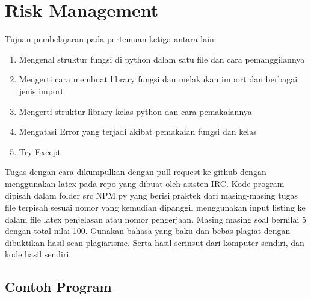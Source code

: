 \chapter{Risk Management}
Tujuan pembelajaran pada pertemuan ketiga antara lain:
\begin{enumerate}
\item
Mengenal struktur fungsi di python dalam satu file dan cara pemanggilannya
\item
Mengerti cara membuat library fungsi dan melakukan import dan berbagai jenis import
\item
Mengerti struktur library kelas python dan cara pemakaiannya
\item
Mengatasi Error yang terjadi akibat pemakaian fungsi dan kelas
\item
Try Except
\end{enumerate}
Tugas dengan cara dikumpulkan dengan pull request ke github dengan menggunakan latex pada repo yang dibuat oleh asisten IRC. Kode program dipisah dalam folder src NPM.py yang berisi praktek dari masing-masing tugas file terpisah sesuai nomor yang kemudian dipanggil menggunakan input listing ke dalam file latex penjelasan atau nomor pengerjaan. Masing masing soal bernilai 5 dengan total nilai 100. Gunakan bahasa yang baku dan bebas plagiat dengan dibuktikan hasil scan plagiarisme. Serta hasil scrinsut dari komputer sendiri, dan kode hasil sendiri.

\section{Contoh Program}
